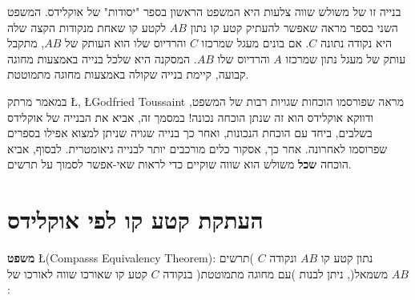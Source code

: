 \np

בנייה זו של משולש שווה צלעות היא המשפט הראשון בספר "יסודות" של אוקלידס. המשפט השני בספר מראה שאפשר להעתיק קטע קו נתון
$AB$
לקטע קו שאחת מנקודות הקצה שלה היא נקודה נתונה
$C$.
אם בונים מעגל שמרכזו
$C$
והרדיוס שלו הוא העותק של
$AB$,
מתקבל עותק של מעגל נתון שמרכזו 
$A$
והרדיוס שלו
$AB$.
המסקנה היא שלכל בנייה באמצעות מחוגה קבועה, קיימת בנייה שקולה באמצעות מחוגה מתמוטטת.

במאמר מרתק 
\L{\cite{toussaint}}, 
\L{Godfried Toussaint}
מראה שפורסמו הוכחות שגויות רבות של המשפט, ודווקא אוקלידס הוא זה שנתן הוכחה נכונה! במסמך זה, אביא את הבנייה של אוקלידס בשלבים, ביחד עם הוכחת הנכונות, ואחר כך בנייה שגויה שניתן למצוא אפילו בספרים שפרוסמו לאחרונה. אחר כך, אסקור כלים מורכבים יותר לבנייה גיאומטרית. לבסוף, אביא הוכחה
\textbf{שכל}
משולש הוא שווה שוקיים כדי לראות שאי-אפשר לסמוך על תרשים.


\section{%
העתקת קטע קו לפי אוקלידס%
}

\textbf{משפט}
\L{(Compasss Equivalency Theorem)}:
נתון קטע קו
$AB$
ונקודה
$C$
)תרשים משמאל(, ניתן לבנות )עם מחוגה מתמוטטת( בנקודה
$C$
קטע קו שאורכו שווה לאורכו של 
$AB$:


\begin{center}
\end{center}


